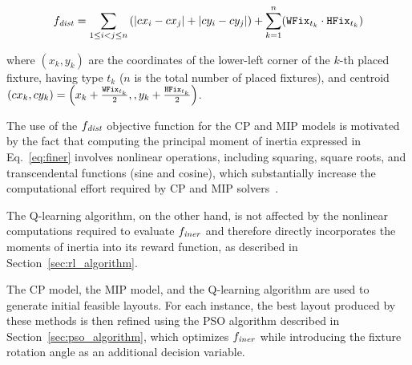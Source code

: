 \begin{equation}
	f_\mathit{dist} = \sum_{1 \le i < j \le n} \left(|cx_i - cx_j| + |cy_i - cy_j|\right) + \sum_{k=1}^{n} (\mathtt{WFix}_{t_k} \cdot \mathtt{HFix}_{t_k})
	\label{eq:f_dist}
\end{equation}

where $(x_k,y_k)$ are the coordinates of the lower-left corner of the $k$-th placed fixture, having type $t_k$ ($n$ is the total number of placed fixtures), and centroid $(cx_k,cy_k)=\left(x_k+\frac{\mathtt{WFix}_{t_k}}{2},,y_k+\frac{\mathtt{HFix}_{t_k}}{2}\right)$.

The use of the $f_\mathit{dist}$ objective function for the CP and MIP models is motivated by the fact that computing the principal moment of inertia expressed in Eq.~\ref{eq:finer} involves nonlinear operations, including squaring, square roots, and transcendental functions (sine and cosine), which substantially increase the computational effort required by CP and MIP solvers~\cite{leyffer2009applications}.

The Q-learning algorithm, on the other hand, is not affected by the nonlinear computations required to evaluate $f_\mathit{iner}$ and therefore directly incorporates the moments of inertia into its reward function, as described in Section~\ref{sec:rl_algorithm}.

The CP model, the MIP model, and the Q-learning algorithm are used to generate initial feasible layouts. For each instance, the best layout produced by these methods is then refined using the PSO algorithm described in Section~\ref{sec:pso_algorithm}, which optimizes $f_\mathit{iner}$ while introducing the fixture rotation angle as an additional decision variable.